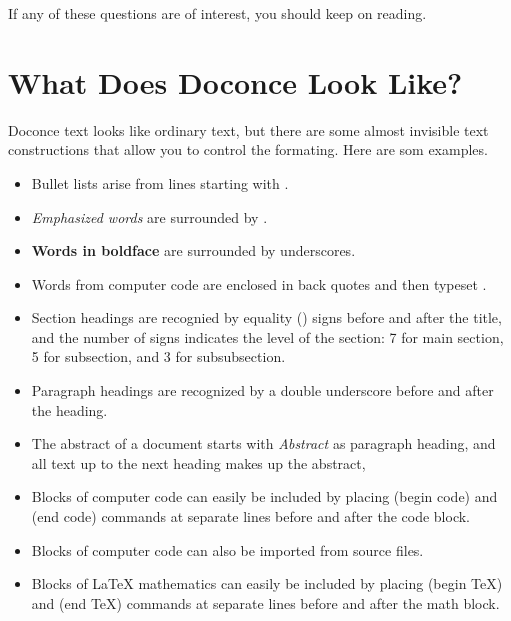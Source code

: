 \documentclass[%
oneside,                 %
final,                   %
chapterprefix=true,      %
open=right               %
10pt]{book}
\begin{document}
\noindent
If any of these questions are of interest, you should keep on reading.


\section{What Does Doconce Look Like?}

Doconce text looks like ordinary text, but there are some almost invisible
text constructions that allow you to control the formating. Here are
som examples.

\begin{itemize}
  \item Bullet lists arise from lines starting with \code{*}.

  \item \emph{Emphasized words} are surrounded by \code{*}.

  \item \textbf{Words in boldface} are surrounded by underscores.

  \item Words from computer code are enclosed in back quotes and
    then typeset .

  \item Section headings are recognied by equality (\code{=}) signs before
    and after the title, and the number of \code{=} signs indicates the
    level of the section: 7 for main section, 5 for subsection, and
    3 for subsubsection.

  \item Paragraph headings are recognized by a double underscore
    before and after the heading.

  \item The abstract of a document starts with \emph{Abstract} as paragraph
    heading, and all text up to the next heading makes up the abstract,

  \item Blocks of computer code can easily be included by placing
     (begin code) and  (end code) commands at separate lines
    before and after the code block.

  \item Blocks of computer code can also be imported from source files.

  \item Blocks of {\LaTeX} mathematics can easily be included by placing
     (begin TeX) and  (end TeX) commands at separate lines
    before and after the math block.


\end{itemize}
\end{document}

